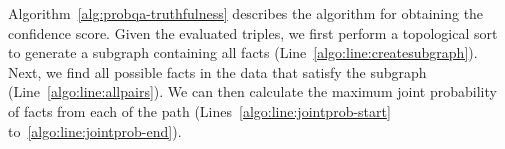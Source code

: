 Algorithm~\ref{alg:probqa-truthfulness} describes the algorithm for obtaining the confidence score.
Given the evaluated triples, we first perform a topological sort to generate a subgraph containing all facts (Line~\ref{algo:line:createsubgraph}).
Next, we find all possible facts in the data that satisfy the subgraph (Line~\ref{algo:line:allpairs}).
We can then calculate the maximum joint probability of facts from each of the path (Lines~\ref{algo:line:jointprob-start} to~\ref{algo:line:jointprob-end}).





